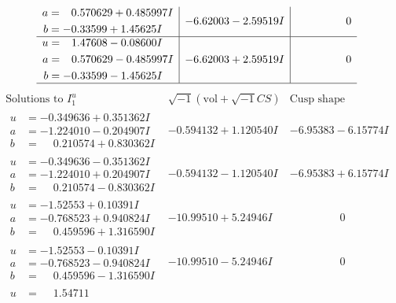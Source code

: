 \documentclass[1p]{elsarticle_modified}
\theoremstyle{definition}
\newcommand{\I}{\sqrt{-1}}
\begin{document}
$$\begin{array}{c|c|c}
\begin{aligned}
a &= \phantom{-}0.570629 + 0.485997 I \\
b &= -0.33599 + 1.45625 I\end{aligned}
 & -6.62003 - 2.59519 I & \phantom{-0.000000 } 0 \\ \hline\begin{aligned}
u &= \phantom{-}1.47608 - 0.08600 I \\
a &= \phantom{-}0.570629 - 0.485997 I \\
b &= -0.33599 - 1.45625 I\end{aligned}
 & -6.62003 + 2.59519 I & \phantom{-0.000000 } 0\\
 \hline 
 \end{array}$$\newpage$$\begin{array}{c|c|c}  
\text{Solutions to }I^u_{1}& \I (\text{vol} + \sqrt{-1}CS) & \text{Cusp shape}\\
 \hline 
\begin{aligned}
u &= -0.349636 + 0.351362 I \\
a &= -1.224010 - 0.204907 I \\
b &= \phantom{-}0.210574 + 0.830362 I\end{aligned}
 & -0.594132 + 1.120540 I & -6.95383 - 6.15774 I \\ \hline\begin{aligned}
u &= -0.349636 - 0.351362 I \\
a &= -1.224010 + 0.204907 I \\
b &= \phantom{-}0.210574 - 0.830362 I\end{aligned}
 & -0.594132 - 1.120540 I & -6.95383 + 6.15774 I \\ \hline\begin{aligned}
u &= -1.52553 + 0.10391 I \\
a &= -0.768523 + 0.940824 I \\
b &= \phantom{-}0.459596 + 1.316590 I\end{aligned}
 & -10.99510 + 5.24946 I & \phantom{-0.000000 } 0 \\ \hline\begin{aligned}
u &= -1.52553 - 0.10391 I \\
a &= -0.768523 - 0.940824 I \\
b &= \phantom{-}0.459596 - 1.316590 I\end{aligned}
 & -10.99510 - 5.24946 I & \phantom{-0.000000 } 0 \\ \hline\begin{aligned}
u &= \phantom{-}1.54711\phantom{ +0.000000I} \\

\end{aligned}
\end{array}$$
\end{document}
